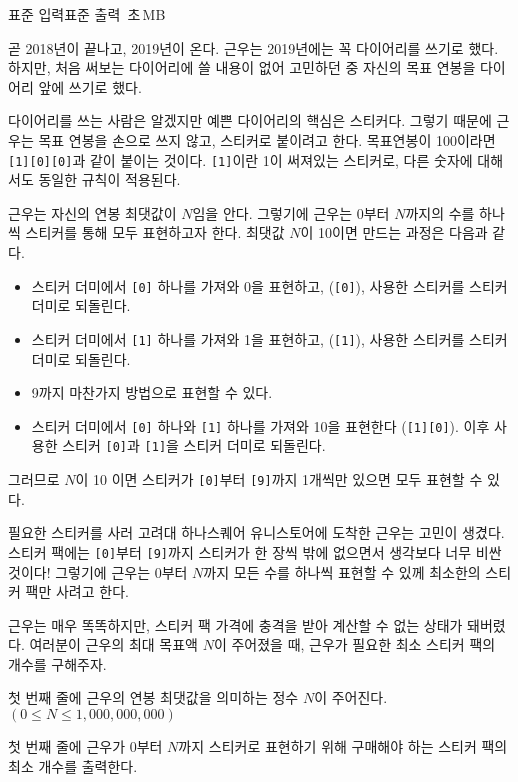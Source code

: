 \begin{problem}{\kcpcstickertitle}
    {표준 입력}{표준 출력}
    {\kcpcstickertime\,초}{\kcpcstickermemory\,MB}{}{\kcpcstickerscore}
    
    곧 2018년이 끝나고, 2019년이 온다. 근우는 2019년에는 꼭 다이어리를 쓰기로 했다. 하지만, 처음 써보는 다이어리에 쓸 내용이 없어 고민하던 중 자신의 목표 연봉을 다이어리 앞에 쓰기로 했다.
    
    다이어리를 쓰는 사람은 알겠지만 예쁜 다이어리의 핵심은 스티커다. 그렇기 때문에 근우는 목표 연봉을 손으로 쓰지 않고, 스티커로 붙이려고 한다. 목표연봉이 100이라면 \texttt{[1][0][0]}과 같이 붙이는 것이다. \texttt{[1]}이란 1이 써져있는 스티커로, 다른 숫자에 대해서도 동일한 규칙이 적용된다.
    
    근우는 자신의 연봉 최댓값이 $ N $임을 안다. 그렇기에 근우는 0부터 $ N $까지의 수를 하나씩 스티커를 통해 모두 표현하고자 한다. 최댓값 $ N $이 10이면 만드는 과정은 다음과 같다.
    
    \begin{itemize}
        \item 스티커 더미에서 \texttt{[0]} 하나를 가져와 0을 표현하고, (\texttt{[0]}), 사용한 스티커를 스티커 더미로 되돌린다.
        \item 스티커 더미에서 \texttt{[1]} 하나를 가져와 1을 표현하고, (\texttt{[1]}), 사용한 스티커를 스티커 더미로 되돌린다.
        \item 9까지 마찬가지 방법으로 표현할 수 있다.
        \item 스티커 더미에서 \texttt{[0]} 하나와 \texttt{[1]} 하나를 가져와 10을 표현한다 (\texttt{[1][0]}). 이후 사용한 스티커 \texttt{[0]}과 \texttt{[1]}을 스티커 더미로 되돌린다.
    \end{itemize}
    
    그러므로 $ N $이 10 이면 스티커가 \texttt{[0]}부터 \texttt{[9]}까지 1개씩만 있으면 모두 표현할 수 있다.
    
    필요한 스티커를 사러 고려대 하나스퀘어 유니스토어에 도착한 근우는 고민이 생겼다. 스티커 팩에는 \texttt{[0]}부터 \texttt{[9]}까지 스티커가 한 장씩 밖에 없으면서 생각보다 너무 비싼 것이다! 그렇기에 근우는 0부터 $ N $까지 모든 수를 하나씩 표현할 수 있께 최소한의 스티커 팩만 사려고 한다. 
       
    근우는 매우 똑똑하지만, 스티커 팩 가격에 충격을 받아 계산할 수 없는 상태가 돼버렸다. 여러분이 근우의 최대 목표액 $ N $이 주어졌을 때, 근우가 필요한 최소 스티커 팩의 개수를 구해주자.
    
    \InputFile
    첫 번째 줄에 근우의 연봉 최댓값을 의미하는 정수 $ N $이 주어진다. $ (0 \leq N \leq 1,000,000,000) $
    
    \OutputFile
    첫 번째 줄에 근우가 0부터 $ N $까지 스티커로 표현하기 위해 구매해야 하는 스티커 팩의 최소 개수를 출력한다.

    \Examples
    
    \begin{example}
    \end{example}
     
\end{problem}

